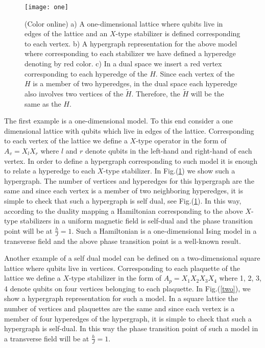 \documentclass[preprintnumbers, showpacs, floatfix,twocolumn,
preprintnumbers, superscriptaddress]{revtex4}
\begin{document}
\begin{figure}[t]
\centering
\texttt{[image: one]}
\caption{(Color online) a) A one-dimensional lattice where qubits
live in edges of the lattice and an $X$-type stabilizer is defined
corresponding to each vertex. b) A hypergraph representation for
the above model where corresponding to each stabilizer we have
defined a hyperedge denoting by red color. c) In a dual space we
insert a red vertex corresponding to each hyperedge of the $H$.
Since each vertex of the $H$ is a member of two hyperedges, in the
dual space each hyperedge also involves two vertices of the
$\tilde{H}$. Therefore, the $\tilde{H}$ will be the same as the
$H$.} \label{one}
\end{figure}
The first example is a one-dimensional model. To this end consider
a one dimensional lattice with qubits which live in edges of the
lattice. Corresponding to each vertex of the lattice we define a
$X$-type operator in the form of $A_v =X_l X_r$ where $l$ and $r$
denote qubits in the left-hand and right-hand of each vertex. In
order to define a hypergraph corresponding to such model it is
enough to relate a hyperedge to each $X$-type stabilizer. In
Fig.(\ref{one}) we show such a hypergraph. The number of vertices
and hyperedges for this hypergraph are the same and since each
vertex is a member of two neighboring hyperedges, it is simple to
check that such a hypergraph is self dual, see Fig.(\ref{one}). In
this way, according to the duality mapping a Hamiltonian
corresponding to the above $X$-type stabilizers in a uniform
magnetic field is self-dual and the phase transition point will be
at $\frac{h}{J}=1$. Such a Hamiltonian is a one-dimensional Ising
model in a transverse field and the above phase transition point
is a well-known result.

Another example of a self dual model can be defined on a two-dimensional square lattice where qubits live in vertices. Corresponding to each plaquette of the lattice we define a $X$-type stabilizer in the form of $A_p =X_1 X_2 X_3 X_4$ where 1, 2, 3, 4 denote qubits on four vertices belonging to each plaquette. In Fig.(\ref{two}), we show a hypergraph representation for such a model. In a square lattice the number of vertices and plaquettes are the same and since each vertex is a member of four hyperedges of the hypergraph, it is simple to check that such a hypergraph is self-dual. In this way the phase transition point of such a model in a transverse field will be at $\frac{h}{J}=1$.
\end{document}
